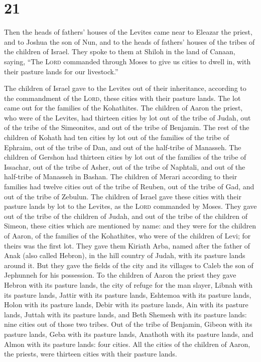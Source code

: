 \hypertarget{section-20}{%
\section{21}\label{section-20}}

 Then the heads of fathers' houses of the Levites came
near to Eleazar the priest, and to Joshua the son of Nun, and to the
heads of fathers' houses of the tribes of the children of Israel.
 They spoke to them at Shiloh in the land of Canaan,
saying, ``The \textsc{Lord} commanded through Moses to give us cities to
dwell in, with their pasture lands for our livestock.''

 The children of Israel gave to the Levites out of their
inheritance, according to the commandment of the \textsc{Lord}, these
cities with their pasture lands.  The lot came out for the
families of the Kohathites. The children of Aaron the priest, who were
of the Levites, had thirteen cities by lot out of the tribe of Judah,
out of the tribe of the Simeonites, and out of the tribe of Benjamin.
 The rest of the children of Kohath had ten cities by lot
out of the families of the tribe of Ephraim, out of the tribe of Dan,
and out of the half-tribe of Manasseh.  The children of
Gershon had thirteen cities by lot out of the families of the tribe of
Issachar, out of the tribe of Asher, out of the tribe of Naphtali, and
out of the half-tribe of Manasseh in Bashan.  The children
of Merari according to their families had twelve cities out of the tribe
of Reuben, out of the tribe of Gad, and out of the tribe of Zebulun.
 The children of Israel gave these cities with their
pasture lands by lot to the Levites, as the \textsc{Lord} commanded by
Moses.  They gave out of the tribe of the children of
Judah, and out of the tribe of the children of Simeon, these cities
which are mentioned by name:  and they were for the
children of Aaron, of the families of the Kohathites, who were of the
children of Levi; for theirs was the first lot.  They
gave them Kiriath Arba, named after the father of Anak (also called
Hebron), in the hill country of Judah, with its pasture lands around it.
 But they gave the fields of the city and its villages to
Caleb the son of Jephunneh for his possession.  To the
children of Aaron the priest they gave Hebron with its pasture lands,
the city of refuge for the man slayer, Libnah with its pasture lands,
 Jattir with its pasture lands, Eshtemoa with its pasture
lands,  Holon with its pasture lands, Debir with its
pasture lands,  Ain with its pasture lands, Juttah with
its pasture lands, and Beth Shemesh with its pasture lands: nine cities
out of those two tribes.  Out of the tribe of Benjamin,
Gibeon with its pasture lands, Geba with its pasture lands,
 Anathoth with its pasture lands, and Almon with its
pasture lands: four cities.  All the cities of the
children of Aaron, the priests, were thirteen cities with their pasture
lands.


